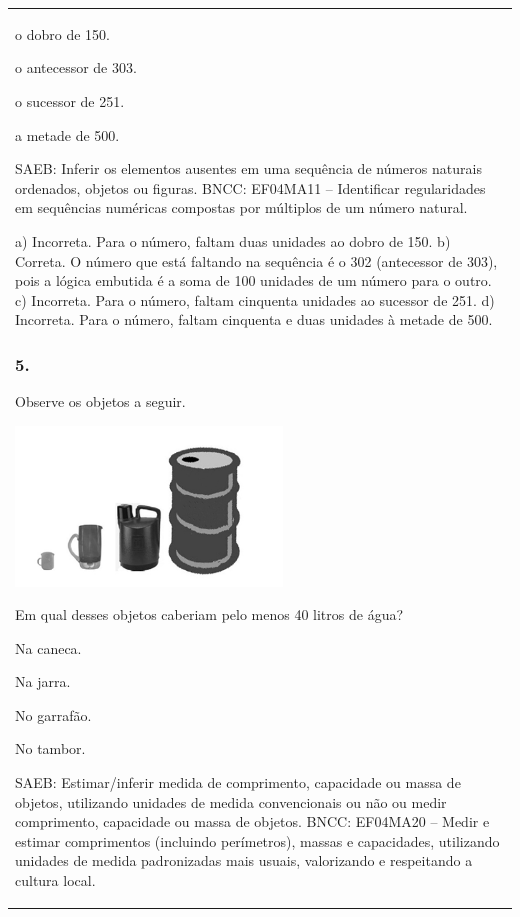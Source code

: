 \begin{mdframed}[linewidth=2pt,linecolor=salmao,roundcorner=2pt]
\begin{escolha}
{{{\begin{longtable}[]{@{}l@{}}
\begin{itemize}
{\begin{escolha}
\item
  o dobro de 150.
\item
  o antecessor de 303.
\item
  o sucessor de 251.
\item
  a metade de 500.
\end{escolha}

SAEB: Inferir os elementos ausentes em uma sequência de
números naturais ordenados, objetos ou figuras.
BNCC: EF04MA11 -- Identificar regularidades em sequências numéricas compostas por múltiplos de um
número natural.

a) Incorreta. Para o número, faltam duas unidades ao dobro de 150.
b) Correta. O número que está faltando na sequência é o 302 (antecessor de 303),
pois a lógica embutida é a soma de 100 unidades de um número para o
outro.
c) Incorreta. Para o número, faltam cinquenta unidades ao sucessor de 251.
d) Incorreta. Para o número, faltam cinquenta e duas unidades à metade de 500.

\subsubsection{5. }

Observe os objetos a seguir.

\includegraphics[width=2.78846in,height=1.67526in]{media/image166.png}

Em qual desses objetos caberiam pelo menos 40 litros de água?

\begin{escolha}
\item
  Na caneca.
\item
  Na jarra.
\item
  No garrafão.
\item
  No tambor.
\end{escolha}

SAEB: Estimar/inferir medida de comprimento, capacidade ou
massa de objetos, utilizando unidades de medida convencionais ou não ou
medir comprimento, capacidade ou massa de objetos.
BNCC: EF04MA20 -- Medir e estimar comprimentos (incluindo perímetros), massas e capacidades, utilizando
unidades de medida padronizadas mais usuais, valorizando e respeitando a cultura local.

}
\end{itemize}
\end{longtable}}}}
\end{escolha}
\end{mdframed}
